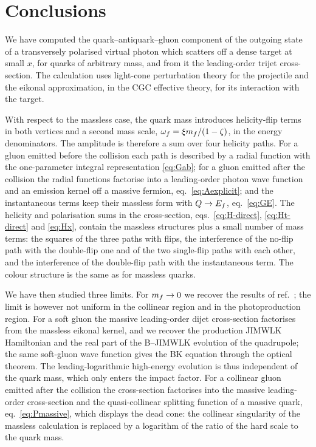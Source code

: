 \section{Conclusions}
\label{sec:conc}

We have computed the quark--antiquark--gluon component of the outgoing state of a transversely
polarised virtual photon which scatters off a dense target at small $x$, for quarks of arbitrary mass,
and from it the leading-order trijet cross-section. The calculation uses light-cone perturbation theory
for the projectile and the eikonal approximation, in the CGC effective theory, for its interaction with
the target.

With respect to the massless case, the quark mass introduces helicity-flip terms in both vertices and
a second mass scale, $\omega_f=\xi m_f/(1-\zeta)$, in the energy denominators. The amplitude is therefore a
sum over four helicity paths. For a gluon emitted before the collision each path is described by a
radial function with the one-parameter integral representation \eqref{eq:Gab}; for a gluon emitted
after the collision the radial functions factorise into a leading-order photon wave function and an
emission kernel off a massive fermion, eq.~\eqref{eq:Aexplicit}; and the instantaneous terms keep their
massless form with $Q\to E_f$, eq.~\eqref{eq:GE}. The helicity and polarisation sums in the
cross-section, eqs.~\eqref{eq:H-direct}, \eqref{eq:Ht-direct} and \eqref{eq:Hx}, contain the massless
structures plus a small number of mass terms: the squares of the three paths with flips, the
interference of the no-flip path with the double-flip one and of the two single-flip paths with each
other, and the interference of the double-flip path with the instantaneous term. The colour structure
is the same as for massless quarks.

We have then studied three limits. For $m_f\to0$ we recover the results of ref.~\cite{Iancu:2022gpw}; the
limit is however not uniform in the collinear region and in the photoproduction region. For a soft
gluon the massive leading-order dijet cross-section factorises from the massless eikonal kernel, and we
recover the production JIMWLK Hamiltonian and the real part of the B--JIMWLK evolution of the
quadrupole; the same soft-gluon wave function gives the BK equation through the optical theorem. The
leading-logarithmic high-energy evolution is thus independent of the quark mass, which only enters the
impact factor. For a collinear gluon emitted after the collision the cross-section factorises into the
massive leading-order cross-section and the quasi-collinear splitting function of a massive quark,
eq.~\eqref{eq:Pmassive}, which displays the dead cone: the collinear singularity of the massless
calculation is replaced by a logarithm of the ratio of the hard scale to the quark mass.

